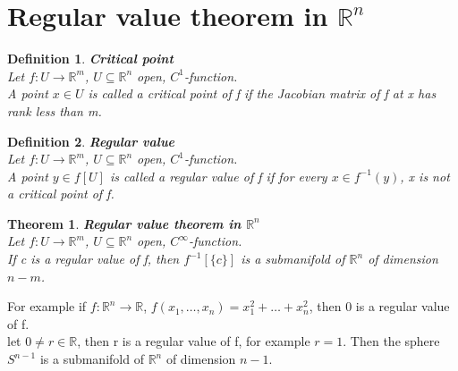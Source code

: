 \documentclass[11pt]{book} %
\newtheorem{theorem}{Theorem}[section]
\newtheorem{definition}{Definition}[section]
\begin{document}

\section{Regular value theorem in \( \mathbb{R}^n \)}

\begin{definition}{\textbf{Critical point}} \\
    Let \( f: U \to \mathbb{R}^m \), \( U \subseteq \mathbb{R}^n \) open, \( C^1 \)-function. \\
    A point \( x \in U \) is called a critical point of f if the Jacobian matrix of f at x has rank less than m.
\end{definition}

\begin{definition}{\textbf{Regular value}} \\
    Let \( f: U \to \mathbb{R}^m \), \( U \subseteq \mathbb{R}^n \) open, \( C^1 \)-function. \\
    A point \( y \in f[U] \) is called a regular value of f if for every \( x \in f^{-1}(y) \), x is not a critical point of f.
\end{definition}

\begin{theorem}{\textbf{Regular value theorem in \( \mathbb{R}^n \)}} \\
    Let \( f: U \to \mathbb{R}^m \), \( U \subseteq \mathbb{R}^n \) open, \( C^\infty \)-function. \\
    If c is a regular value of f, then \( f^{-1}[\{c\}] \) is a submanifold of \( \mathbb{R}^n \) of dimension \( n - m \).
\end{theorem}

For example if \( f: \mathbb{R}^n \to \mathbb{R} \), \( f(x_1, \dots, x_n) = x_1^2 + \dots + x_n^2 \), then 0 is a regular value of f. \\
let \( 0 \neq r \in \mathbb{R} \), then r is a regular value of f, for example \( r = 1 \).
Then the sphere \( S^{n-1} \) is a submanifold of \( \mathbb{R}^n \) of dimension \( n - 1 \).


\end{document}
